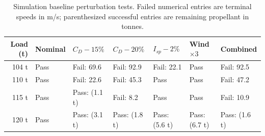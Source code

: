 \begin{table}[htbp]
\caption{Simulation baseline perturbation tests. Failed numerical entries are terminal speeds in m/s; parenthesized successful entries are remaining propellant in tonnes.}
\label{tab:src5}
\small
\setlength{\tabcolsep}{3.5pt}
\begin{tabularx}{\linewidth}{@{}rXXXXXX@{}}
\toprule
Load (t) & Nominal & $C_D-15\%$ & $C_D-20\%$ & $I_{sp}-2\%$ & Wind $\times3$ & Combined \\
\midrule
104 t & Pass & Fail: 69.6 & Fail: 92.9 & Fail: 22.1 & Pass & Fail: 92.5 \\
110 t & Pass & Fail: 22.6 & Fail: 45.3 & Pass & Pass & Fail: 47.2 \\
115 t & Pass & Pass: (1.1 t) & Fail: 8.2 & Pass & Pass & Fail: 10.9 \\
120 t & Pass & Pass: (3.1 t) & Pass: (1.8 t) & Pass: (5.6 t) & Pass: (6.7 t) & Pass: (1.6 t) \\
\bottomrule
\end{tabularx}
\par{}
\end{table}
